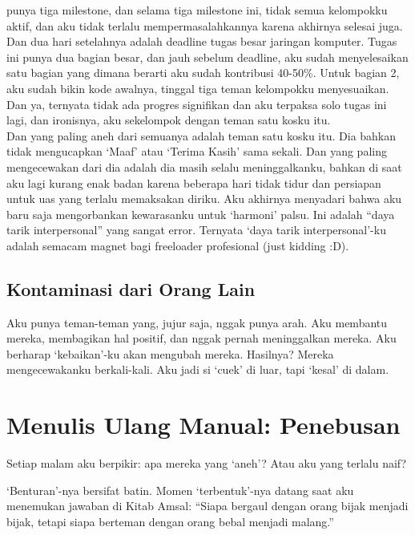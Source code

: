 \documentclass[
  letterpaper,
  DIV=11,
  numbers=noendperiod]{scrreprt}
\begin{document}
punya tiga milestone, dan selama tiga milestone ini, tidak semua
kelompokku aktif, dan aku tidak terlalu mempermasalahkannya karena
akhirnya selesai juga. Dan dua hari setelahnya adalah deadline tugas
besar jaringan komputer. Tugas ini punya dua bagian besar, dan jauh
sebelum deadline, aku sudah menyelesaikan satu bagian yang dimana
berarti aku sudah kontribusi 40-50\%. Untuk bagian 2, aku sudah bikin
kode awalnya, tinggal tiga teman kelompokku menyesuaikan. Dan ya,
ternyata tidak ada progres signifikan dan aku terpaksa solo tugas ini
lagi, dan ironisnya, aku sekelompok dengan teman satu kosku itu.\\
Dan yang paling aneh dari semuanya adalah teman satu kosku itu. Dia
bahkan tidak mengucapkan `Maaf' atau `Terima Kasih' sama sekali. Dan
yang paling mengecewakan dari dia adalah dia masih selalu
meninggalkanku, bahkan di saat aku lagi kurang enak badan karena
beberapa hari tidak tidur dan persiapan untuk uas yang terlalu
memaksakan diriku. Aku akhirnya menyadari bahwa aku baru saja
mengorbankan kewarasanku untuk `harmoni' palsu. Ini adalah ``daya tarik
interpersonal'' yang sangat error. Ternyata `daya tarik
interpersonal'-ku adalah semacam magnet bagi freeloader profesional
(just kidding :D).

\subsection{\texorpdfstring{\textbf{Kontaminasi dari Orang
Lain}}{Kontaminasi dari Orang Lain}}\label{kontaminasi-dari-orang-lain}

Aku punya teman-teman yang, jujur saja, nggak punya arah. Aku membantu
mereka, membagikan hal positif, dan nggak pernah meninggalkan mereka.
Aku berharap `kebaikan'-ku akan mengubah mereka. Hasilnya? Mereka
mengecewakanku berkali-kali. Aku jadi si `cuek' di luar, tapi `kesal' di
dalam.

\section{\texorpdfstring{\textbf{Menulis Ulang Manual:
Penebusan}}{Menulis Ulang Manual: Penebusan}}\label{menulis-ulang-manual-penebusan}

Setiap malam aku berpikir: apa mereka yang `aneh'? Atau aku yang terlalu
naif?

`Benturan'-nya bersifat batin. Momen `terbentuk'-nya datang saat aku
menemukan jawaban di Kitab Amsal: ``Siapa bergaul dengan orang bijak
menjadi bijak, tetapi siapa berteman dengan orang bebal menjadi
malang.''
\end{document}

